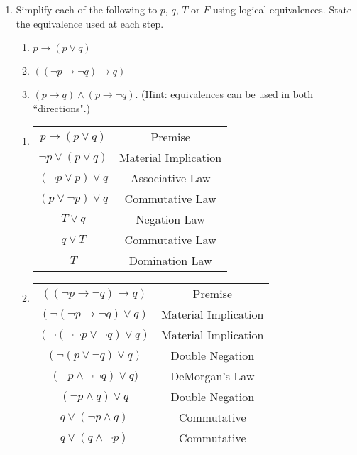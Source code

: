 \begin{enumerate}
    \item Simplify each of the following to $p$, $q$, $T$ or $F$ using logical equivalences. State the equivalence used at each step. 
    
    \begin{enumerate}
        \item $p \rightarrow (p \vee q)$
        \item $((\lnot p \rightarrow \lnot q) \rightarrow q)$
        \item $(p \rightarrow q) \wedge (p \rightarrow \lnot q)$. (Hint: equivalences can be used in both ``directions".)
    \end{enumerate}
    
    \begin{solution}
    \begin{enumerate}
        \item \begin{tabular}{c|c}
            $p \rightarrow (p \lor q)$ & Premise \\
            $\neg p \lor (p \lor q)$ & Material Implication \\
            $(\neg p \lor p) \lor q$ & Associative Law \\
            $(p \lor \neg p) \lor q$ & Commutative Law \\
            $T \lor q$ & Negation Law \\
            $q \lor T$ & Commutative Law \\
            $T$ & Domination Law \\
        \end{tabular}
        \item \begin{tabular}{c|c}
            $((\lnot p \rightarrow \lnot q) \rightarrow q)$ & Premise \\
            $(\neg(\lnot p \rightarrow \lnot q) \lor q)$ & Material Implication \\
            $(\neg(\neg \neg p \lor \neg q) \lor q)$ & Material Implication \\
            $(\neg(p \lor \neg q) \lor q)$ & Double Negation\\
            $(\neg p \land \neg \neg q) \lor q)$ & DeMorgan's Law\\
            $(\neg p \land q) \lor q$ & Double Negation\\
            $q \lor (\neg p \land q)$ & Commutative\\
            $q \lor (q \land \neg p)$ & Commutative\\

\end{tabular}
\end{enumerate}
\end{solution}
\end{enumerate}
